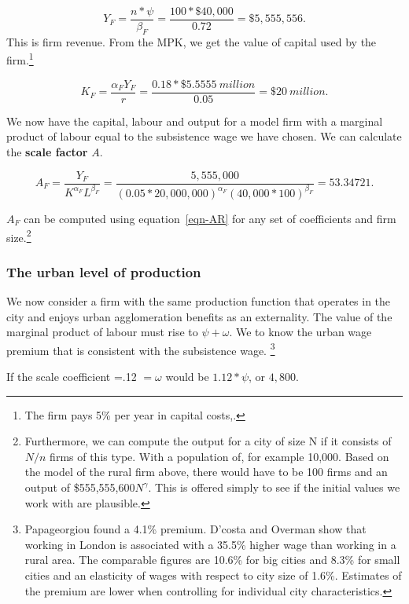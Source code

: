 \[Y_F=\frac{n*\psi}{\beta_F}=\frac{100*\$40,000}{0.72}=\$5,555,556.\]
This is firm revenue. From the MPK, we get the value of capital used by the firm.\footnote{The firm pays 5\% per year in capital costs,.} 

\[K_F=  \frac{\alpha_F Y_F }{r}=\frac{0.18 *\$5.5555\ million}{0.05} =\$20\ million. \]

We now have the capital, labour and output for a model firm with a marginal product of labour  equal to the subsistence wage we have chosen. We can calculate the \textbf{scale factor} $A$.

\begin{equation}  
A_F= \frac{Y_F}{K^{\alpha_F} L^{\beta_F}}=\frac{5,555,000}
{(0.05*20,000,000)^{\alpha_F} (40,000*100)^{\beta_F}} =53.34721. \label{eqn-AR}\end{equation} 

%
$A_F$ can be computed using equation~\ref{eqn-AR} for any set of coefficients and firm size.\footnote{Furthermore, we can compute the output for a city of size N if it consists of $N/n$ firms of this type. With a population of, for example 10,000. Based on the model of the rural firm above,   there would have to be  100 firms and an output of \$555,555,600$N^\gamma$. This is offered simply to see if the initial values we work with are plausible.}



 \subsubsection{The urban level of production}
We now consider a firm with the same production function that operates in the city and enjoys  urban agglomeration benefits as an externality. The value of the  marginal product of labour must rise to $\psi+\omega$. We to know  the urban wage premium that is consistent with the subsistence wage. \footnote{Papageorgiou \cite{papageorgiouOccupationalMatchingCities2022} found a 4.1\% premium. D'costa and Overman   show that working in London is associated with a 35.5\% higher wage than working in a rural area. The comparable figures are 10.6\% for big cities and 8.3\% for small cities and an elasticity of wages with respect to city size of 1.6\%. Estimates of the premium are lower  when controlling for individual city characteristics.}   

If the scale coefficient =.12 $=\omega$ would be $1.12*\psi$, or $4,800$.

